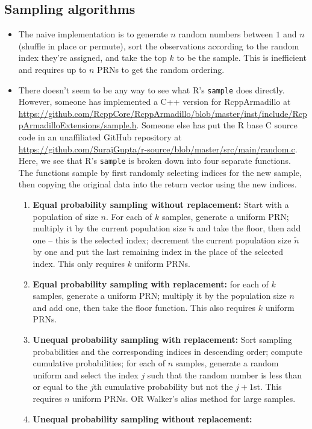 \documentclass[12pt]{article}
\begin{document}
\subsection{Sampling algorithms}
\begin{itemize}
\item The naive implementation is to generate $n$ random numbers between $1$ and $n$ (shuffle in place or permute),
sort the observations according to the random index they're assigned,
and take the top $k$ to be the sample.
This is inefficient and requires up to $n$ PRNs to get the random ordering.
\item There doesn't seem to be any way to see what R's \texttt{sample} does directly.
However, someone has implemented a C++ version for RcppArmadillo at \url{https://github.com/RcppCore/RcppArmadillo/blob/master/inst/include/RcppArmadilloExtensions/sample.h}.
Someone else has put the R base C source code in an unaffiliated GitHub repository at \url{https://github.com/SurajGupta/r-source/blob/master/src/main/random.c}.
Here, we see that R's \texttt{sample} is broken down into four separate functions.
The functions sample by first randomly selecting indices for the new sample, then copying the original data into the return vector using the new indices.
\begin{enumerate}
\item \textbf{Equal probability sampling without replacement:} 
Start with a population of size $n$.
For each of $k$ samples, generate a uniform PRN;
multiply it by the current population size $\tilde{n}$ and take the floor, then add one -- this is the selected index;
decrement the current population size $\tilde{n}$ by one and put the last remaining index in the place of the selected index.
This only requires $k$ uniform PRNs.
\item \textbf{Equal probability sampling with replacement:} 
for each of $k$ samples, generate a uniform PRN;
multiply it by the population size $n$ and add one, then take the floor function.
This also requires $k$ uniform PRNs.
\item \textbf{Unequal probability sampling with replacement:} 
Sort sampling probabilities and the corresponding indices in descending order; 
compute cumulative probabilities; 
for each of $n$ samples, generate a random uniform and select the index $j$ such that the random number is less than or equal to the $j$th cumulative probability but not the $j+1$st.  
This requires $n$ uniform PRNs.  
OR Walker's alias method for large samples.
\item \textbf{Unequal probability sampling without replacement:} 

\end{enumerate}
\end{itemize}
\end{document}
